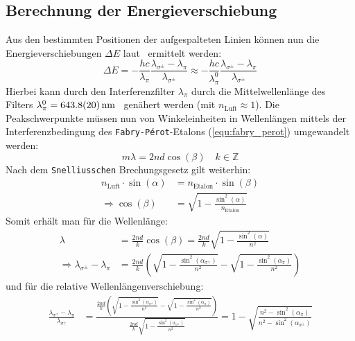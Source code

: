 \subsection{Berechnung der Energieverschiebung}
Aus den bestimmten Positionen der aufgespalteten Linien können nun die Energieverschiebungen $\Delta E$ laut~\cite{praktikum4} ermittelt werden:
\begin{equation}
    \Delta E = -\frac{hc}{\lambda_{\pi}}\frac{\lambda_{\sigma^{\pm}} - \lambda_{\pi}}{\lambda_{\sigma^{\pm}}}
            \approx -\frac{hc}{\lambda_{\pi}^0}\frac{\lambda_{\sigma^{\pm}} - \lambda_{\pi}}{\lambda_{\sigma^{\pm}}}\label{equ:deltaE_anleitung}
\end{equation}
Hierbei kann durch den Interferenzfilter $\lambda_{\pi}$ durch die Mittelwellenlänge des Filters $\lambda_{\pi}^0 = \SI{643.8 \pm 2}{\nano\meter}$~\cite{praktikum4} genähert werden (mit $n_{\text{Luft}}\approx 1$).
Die Peakschwerpunkte müssen nun von Winkeleinheiten in Wellenlängen mittels der Interferenzbedingung des \texttt{Fabry-Pérot}-Etalons (\cref{equ:fabry_perot}) umgewandelt werden:
\begin{equation*}
    m\lambda = 2nd\cos(\beta)\quad k\in\mathbb{Z}
\end{equation*}
\newpage
\noindent Nach dem \texttt{Snelliusschen} Brechungsgesetz gilt weiterhin:
\begin{align*}
    n_{\text{Luft}}\cdot\sin(\alpha) &= n_{\text{Etalon}}\cdot\sin(\beta)\\
    \Rightarrow \cos(\beta) &= \sqrt{1-\frac{\sin^2(\alpha)}{n_{\text{Etalon}}}}
\end{align*}
Somit erhält man für die Wellenlänge:
\begin{align}
    \lambda &= \frac{2nd}{k}\cos(\beta) = \frac{2nd}{k}\sqrt{1-\frac{\sin^2(\alpha)}{n^2}}\\
    \Rightarrow \lambda_{\sigma^{\pm}} - \lambda_{\pi} 
        &= \frac{2nd}{k}\left(\sqrt{1-\frac{\sin^2(\alpha_{\sigma^{\pm}})}{n^2}}
                                - \sqrt{1-\frac{\sin^2(\alpha_{\pi})}{n^2}}\right) \nonumber
\end{align}
und für die relative Wellenlängenverschiebung:
\begin{align}
    \frac{\lambda_{\sigma^{\pm}} - \lambda_{\pi}}{\lambda_{\sigma^{\pm}}} 
            &=\frac{\frac{2nd}{k}\left(\sqrt{1-\frac{\sin^2(\alpha_{\sigma^{\pm}})}{n^2}}
            - \sqrt{1-\frac{\sin^2(\alpha_{\pi})}{n^2}}\right)}{\frac{2nd}{k}\sqrt{1-\frac{\sin^2(\alpha_{\sigma^{\pm}})}{n^2}}}= 1-\sqrt{\frac{n^2-\sin^2(\alpha_{\pi})}{n^2-\sin^2(\alpha_{\sigma^{\pm}})}}\label{equ:rel_Wellenanderung}
\end{align}
